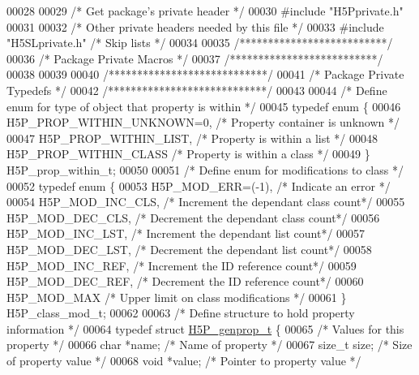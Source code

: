 \begin{DoxyCode}
00028 
00029 \textcolor{comment}{/* Get package's private header */}
00030 \textcolor{preprocessor}{#include "H5Pprivate.h"}
00031 
00032 \textcolor{comment}{/* Other private headers needed by this file */}
00033 \textcolor{preprocessor}{#include "H5SLprivate.h"}    \textcolor{comment}{/* Skip lists               */}
00034 
00035 \textcolor{comment}{/**************************/}
00036 \textcolor{comment}{/* Package Private Macros */}
00037 \textcolor{comment}{/**************************/}
00038 
00039 
00040 \textcolor{comment}{/****************************/}
00041 \textcolor{comment}{/* Package Private Typedefs */}
00042 \textcolor{comment}{/****************************/}
00043 
00044 \textcolor{comment}{/* Define enum for type of object that property is within */}
00045 \textcolor{keyword}{typedef} \textcolor{keyword}{enum} \{
00046     H5P\_PROP\_WITHIN\_UNKNOWN=0,  \textcolor{comment}{/* Property container is unknown */}
00047     H5P\_PROP\_WITHIN\_LIST,       \textcolor{comment}{/* Property is within a list */}
00048     H5P\_PROP\_WITHIN\_CLASS       \textcolor{comment}{/* Property is within a class */}
00049 \} H5P\_prop\_within\_t;
00050 
00051 \textcolor{comment}{/* Define enum for modifications to class */}
00052 \textcolor{keyword}{typedef} \textcolor{keyword}{enum} \{
00053     H5P\_MOD\_ERR=(-1),   \textcolor{comment}{/* Indicate an error */}
00054     H5P\_MOD\_INC\_CLS,    \textcolor{comment}{/* Increment the dependant class count*/}
00055     H5P\_MOD\_DEC\_CLS,    \textcolor{comment}{/* Decrement the dependant class count*/}
00056     H5P\_MOD\_INC\_LST,    \textcolor{comment}{/* Increment the dependant list count*/}
00057     H5P\_MOD\_DEC\_LST,    \textcolor{comment}{/* Decrement the dependant list count*/}
00058     H5P\_MOD\_INC\_REF,    \textcolor{comment}{/* Increment the ID reference count*/}
00059     H5P\_MOD\_DEC\_REF,    \textcolor{comment}{/* Decrement the ID reference count*/}
00060     H5P\_MOD\_MAX         \textcolor{comment}{/* Upper limit on class modifications */}
00061 \} H5P\_class\_mod\_t;
00062 
00063 \textcolor{comment}{/* Define structure to hold property information */}
00064 \textcolor{keyword}{typedef} \textcolor{keyword}{struct }\hyperlink{struct_h5_p__genprop__t}{H5P\_genprop\_t} \{
00065     \textcolor{comment}{/* Values for this property */}
00066     \textcolor{keywordtype}{char} *name;         \textcolor{comment}{/* Name of property */}
00067     \textcolor{keywordtype}{size\_t} size;        \textcolor{comment}{/* Size of property value */}
00068     \textcolor{keywordtype}{void} *value;        \textcolor{comment}{/* Pointer to property value */}

\end{DoxyCode}
